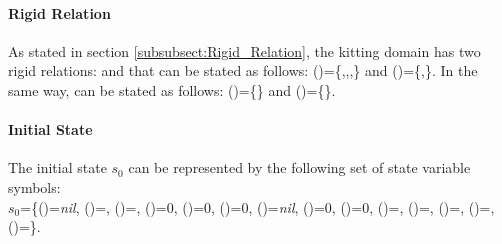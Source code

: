 \paragraph{Rigid Relation}
\begin{comment}
As stated in section \ref{subsubsect:Rigid_Relation}, the kitting domain has two rigid relations: \stvar{efftype} and \stvar{effhtype}. In the proposed example, the \class{EndEffector} \const{eff_1} can hold \class{KitTrays} and \class{KitInstances}, while the \class{EndEffector} \const{eff_1} can hold \class{Parts}. \stvar{efftype} can be stated as follows: \stvar{efftype}(\const{eff_1})=\{\const{kt_1},\const{kins_1}\} and \stvar{efftype}(\const{eff_1})=\{\const{part_{A-1}},\const{part_{A-2}},\const{part_{B}},\const{part_{C}}\}. In the same way, the \class{EndEffectorHolder} \const{effh_1} can hold the \class{EndEffector} \const{eff_1}, while the \class{EndEffectorHolder} \const{effh_2} can hold the \class{EndEffector} \const{eff_2}. \stvar{effhtype} can be stated as follows: \stvar{effhtype}(\const{effh_1})=\{\const{eff_1}\} and \stvar{effhtype}(\const{effh_2})=\{\const{eff_2}\}.
\end{comment}
As stated in section \ref{subsubsect:Rigid_Relation}, the kitting domain has two rigid relations:  and  that can be stated as follows: ()=\{,,,\} and ()=\{,\}. In the same way,  can be stated as follows: ()=\{\} and ()=\{\}.

\paragraph{Initial State}
The initial state $s_0$ can be represented by the following set of state variable symbols:\\
$s_0$=\{()=\textit{nil}, ()=, ()=, ()=0, ()=0, ()=0, ()=\textit{nil}, ()=0, ()=0, ()=, ()=, ()=, ()=, ()=\}.

